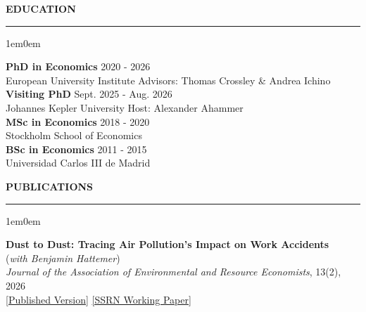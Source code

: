 \documentclass[12pt]{article}
\begin{document}

\vspace{0.5em} %
\noindent\textbf{EDUCATION}\\
\noindent\rule[8pt]{\textwidth}{0.5pt}

\begin{adjustwidth}{1em}{0em}

\noindent\textbf{PhD in Economics} \hfill 2020 - 2026 \\
European University Institute \hfill
Advisors: Thomas Crossley \& Andrea Ichino\\

\noindent\textbf{Visiting PhD} \hfill Sept. 2025 - Aug. 2026 \\
Johannes Kepler University \hfill
Host: Alexander Ahammer\\

\noindent\textbf{MSc in Economics} \hfill 2018 - 2020 \\
Stockholm School of Economics\\

\noindent\textbf{BSc in Economics} \hfill 2011 - 2015 \\
Universidad Carlos III de Madrid \\

\end{adjustwidth}



\vspace{0.5em} %
\noindent\textbf{PUBLICATIONS}\\
\noindent\rule[8pt]{\textwidth}{0.5pt}

\begin{adjustwidth}{1em}{0em}

\textbf{Dust to Dust: Tracing Air Pollution’s Impact on Work Accidents} \\ (\textit{with Benjamin Hattemer}) \\
\textit{Journal of the Association of Environmental and Resource Economists}, 13(2), 2026 \\
\href{https://doi.org/10.1086/739151}{[Published Version]} \href{https://papers.ssrn.com/sol3/papers.cfm?abstract_id=4812658}{[SSRN Working Paper]} \\
\end{adjustwidth}
\end{document}
